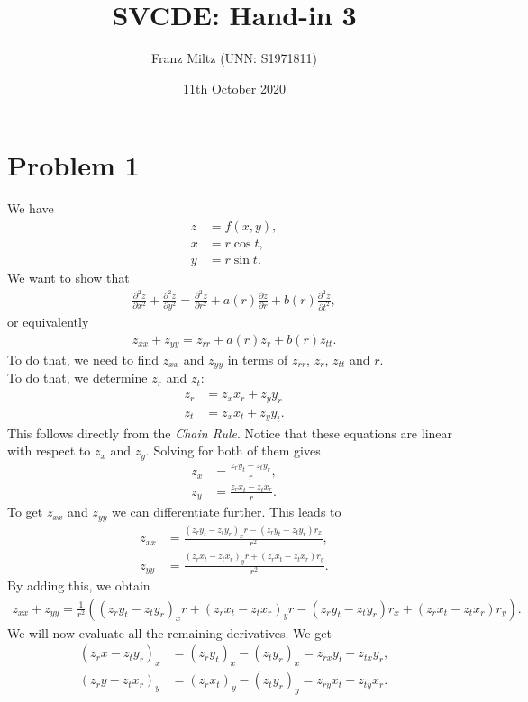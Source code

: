 \documentclass{article}
\title{SVCDE: Hand-in 3}
\author{Franz Miltz (UNN: S1971811)}
\newcommand{\p}{\partial }
\begin{document}
\date{11th October 2020}
\maketitle
\section*{Problem 1}
We have
\begin{align*}
  z &= f(x,y),\\
  x &= r\cos t,\\
  y &= r\sin t.
\end{align*}
We want to show that
\begin{align*}
  \frac{\p^2 z}{\p x^2}+\frac{\p^2 z}{\p y^2}
  = \frac{\p^2 z}{\p r^2}+a(r)\frac{\p z}{\p r}+b(r)\frac{\p^2 z}{\p t^2},
\end{align*}
or equivalently
\begin{align}
  \label{eq1}
  z_{xx} + z_{yy} = z_{rr} + a(r)z_r + b(r)z_{tt}.
\end{align}
To do that, we need to find $z_{xx}$ and $z_{yy}$ in terms 
of $z_{rr}$, $z_r$, $z_{tt}$ and $r$.\\
To do that, we determine $z_r$ and $z_t$:
\begin{align*}
  z_r &= z_x x_r + z_y y_r\\
  z_t &= z_x x_t + z_y y_t.
\end{align*}
This follows directly from the \emph{Chain Rule}. Notice that these equations
are linear with respect to $z_x$ and $z_y$. Solving for both of them gives
\begin{align*}
  z_x &= \frac{z_r y_t - z_t y_r}{r},\\
  z_y &= \frac{z_r x_t - z_t x_r}{r}.
\end{align*}
To get $z_{xx}$ and $z_{yy}$ we can differentiate further. This leads to
\begin{align*}
  z_{xx} &= \frac{(z_r y_t-z_t y_r)_x r - (z_r y_t - z_t y_r)r_x}{r^2},\\
  z_{yy} &= \frac{(z_r x_t - z_t x_r)_y r + (z_r x_t - z_t x_r)r_y}{r^2}.
\end{align*}
By adding this, we obtain
\begin{align*}
  z_{xx}+ z_{yy} =\frac{1}{r^2}( 
   (z_r y_t-z_t y_r)_x r +(z_r x_t - z_t x_r)_y r - (z_r y_t - z_t y_r)r_x
   + (z_r x_t - z_t x_r)r_y).
\end{align*}
We will now evaluate all the remaining derivatives. We get
\begin{align*}
  (z_r x - z_t y_r)_x &= (z_r y_t)_x - (z_t y_r)_x = z_{rx} y_t - z_{tx} y_r,\\
  (z_r y - z_t x_r)_y &= (z_r x_t)_y - (z_t y_r)_y = z_{ry} x_t - z_{ty} x_r.
\end{align*}
\end{document}
